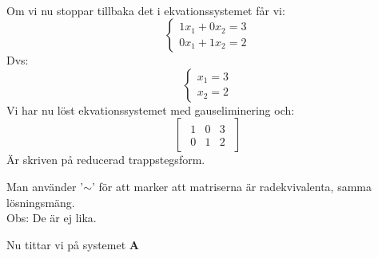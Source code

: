 \begin{Ex}
\begin{elimination}[1]{2}{1.75em}{1.1}
{    \\
}
\end{elimination}
Om vi nu stoppar tillbaka det i ekvationssystemet får vi:
\[
    \begin{cases}
        1x_1 + 0x_2 = 3 \\
        0x_1 + 1x_2 = 2
    \end{cases}
\]
Dvs:
\[
    \begin{cases}
        x_1 = 3\\
        x_2 = 2
    \end{cases}
\]
Vi har nu löst ekvationssystemet med gauseliminering och:
    \[
    \begin{bmatrix}
    \begin{array}{cc|c}
    1 & 0 & 3\\
    0 & 1 & 2
    \end{array}
    \end{bmatrix}
    \]
    Är skriven på reducerad trappstegsform.
\end{Ex}

\begin{Rem}
    Man använder '$\sim$' för att marker att matriserna är radekvivalenta, samma lösningsmäng.\\
    Obs: De är ej lika.
\end{Rem}

Nu tittar vi på systemet \textbf{A}

